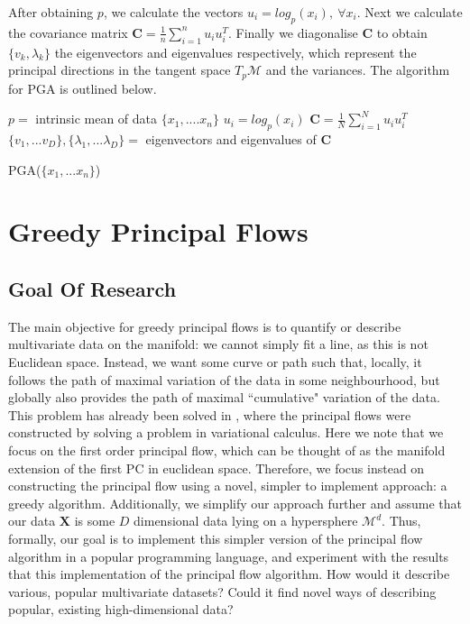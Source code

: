 \documentclass[12pt]{report}
\begin{document}
After obtaining $p$, we calculate the vectors $u_i = log_p(x_i), \ \forall x_i$.
Next we calculate the covariance matrix 
$\mathbf{C} = \frac{1}{n} \sum^n_{i=1} u_iu_i^T$.
Finally we diagonalise $\mathbf{C}$ to obtain $\{v_k, \lambda_k\}$ 
the eigenvectors and eigenvalues respectively, 
which represent the principal directions 
in the tangent space $T_p\mathcal{M}$ and the variances.
The algorithm for PGA is outlined below.
\begin{algorithm}
    $p = $ intrinsic mean of data $\{x_1,....x_n\}$\;
    $u_i = log_p(x_i)$\;
    $\mathbf{C} = \frac{1}{N}\sum^N_{i=1}u_i u_i^T$\;
    $\{v_1,...v_D\}, \{\lambda_1,...\lambda_D\} = $ eigenvectors and eigenvalues of $\mathbf{C}$\;
    \caption{PGA($\{x_1,...x_n\}$)}
\end{algorithm}

\chapter{Greedy Principal Flows}

\section{Goal Of Research}

The main objective for greedy principal flows is to quantify or describe 
multivariate data on the manifold: we cannot simply fit a line, 
as this is not Euclidean space.
Instead, we want some curve or path such that,
locally, it follows the path of maximal variation of the data in some neighbourhood, 
but globally also provides the path of maximal ``cumulative" variation of the data.
This problem has already been solved in \cite{principalflow}, 
where the principal flows were constructed by 
solving a problem in variational calculus. Here we note that we focus on 
the first order principal flow, which can be thought of as 
the manifold extension of the first PC in euclidean space.
Therefore, we focus instead on constructing the principal flow using a novel, 
simpler to implement approach: a greedy algorithm. 
Additionally, we simplify our approach further and 
assume that our data $\mathbf{X}$ is some $D$ dimensional
data lying on a hypersphere $\mathcal{M}^d$.
Thus, formally, our goal is to implement this simpler version of the
principal flow algorithm in a popular programming language, 
and experiment with the results that this implementation of the
principal flow algorithm. How would it describe various, popular multivariate
datasets? Could it find novel ways of describing popular,
existing high-dimensional data?
\end{document}
